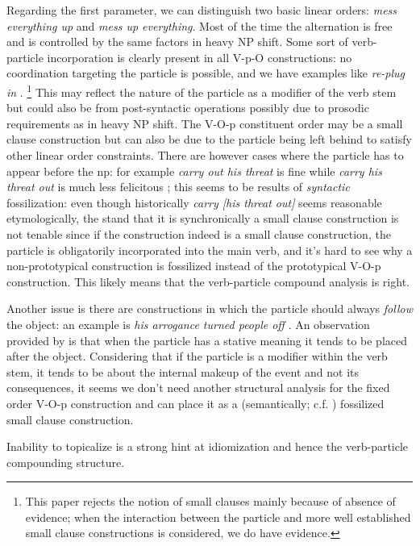\documentclass[UTF8, a4paper, oneside, scheme=plain, 12pt]{ctexbook}
\newcommand*{\citepage}[1]{p.~{#1}}
\newcommand{\form}[1]{\emph{#1}}
\begin{document}
Regarding the first parameter, we can distinguish two basic linear orders:
\form{mess everything up} and \form{mess up everything}.
Most of the time the alternation is free and is controlled by the same factors in heavy NP shift.
Some sort of verb-particle incorporation is clearly present in all V-p-O constructions:
no coordination targeting the particle is possible, 
and we have examples like \form{re-plug in} \citep{farrell2005english}.%
\footnote{
    This paper rejects the notion of small clauses mainly because of absence of evidence; 
    when the interaction between the particle and more well established small clause constructions is considered, we do have evidence.
}
This may reflect the nature of the particle as a modifier of the verb stem
but could also be from post-syntactic operations 
possibly due to prosodic requirements as in heavy NP shift. 
The V-O-p constituent order may be a small clause construction 
but can also be due to the particle being left behind to satisfy other linear order constraints.
There are however cases where the particle has to appear before the \acs{np}:
for example \form{carry out his threat} is fine 
while \form{carry his threat out} is much less felicitous \citep[\citepage{285}]{cgel};
this seems to be results of \emph{syntactic} fossilization:
even though historically \form{carry [his threat out]} seems reasonable etymologically,
the stand that it is synchronically a small clause construction is not tenable 
since if the construction indeed is a small clause construction, 
the particle is obligatorily incorporated into the main verb, 
and it's hard to see why a non-prototypical construction is fossilized 
instead of the prototypical V-O-p construction.
This likely means that the verb-particle compound analysis is right.

Another issue is there are constructions in which the particle should always \emph{follow} the object:
an example is \form{his arrogance turned people off} \citep[\citepage{286}, {[42]}]{cgel}. 
An observation provided by \citet{cgel} is that 
when the particle has a stative meaning it tends to be placed after the object. 
Considering that if the particle is a modifier within the verb stem, 
it tends to be about the internal makeup of the event and not its consequences, 
it seems we don't need another structural analysis for the fixed order V-O-p construction 
and can place it as a (semantically; c.f. ) fossilized small clause construction.

Inability to topicalize is a strong hint at idiomization and hence the verb-particle compounding structure.
\end{document}
